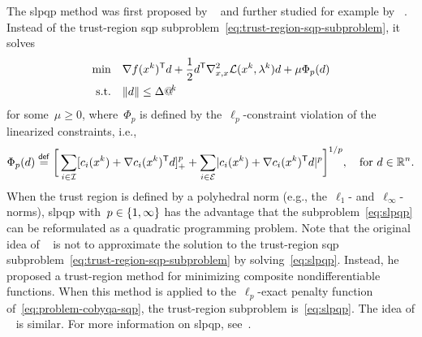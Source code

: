 The \gls{slpqp} method was first proposed by \citeauthor{Fletcher_1982a}~\cite{Fletcher_1982a} and further studied for example by \citeauthor{Yuan_1995}~\cite{Yuan_1995}.
Instead of the trust-region \gls{sqp} subproblem~\cref{eq:trust-region-sqp-subproblem}, it solves
\begin{subequations}
    \label{eq:slpqp}
    \begin{align}
        \min        & \quad \nabla \obj(\iter[k])^{\T} \step + \frac{1}{2} \step^{\T} \nabla_{x, x}^2 \lag(\iter[k], \lm[k]) \step + \mu \Phi_p(d)\\
        \text{s.t.} & \quad \norm{d} \le \rad[k]
    \end{align}
\end{subequations}
for some~$\mu \ge 0$, where~$\Phi_p$ is defined by the~$\ell_p$-constraint violation of the linearized constraints, i.e.,
\begin{equation*}
    \Phi_p(d) \eqdef \bigg[ \sum_{i \in \iub} \posp{\con{i}(\iter[k]) + \nabla \con{i}(\iter[k])^{\T} \step}^p + \sum_{i \in \ieq} \abs{\con{i}(\iter[k]) + \nabla \con{i}(\iter[k])^{\T} \step}^p \bigg]^{1/p}, \quad \text{for~$d \in \R^n$.}
\end{equation*}
When the trust region is defined by a polyhedral norm (e.g., the~$\ell_1$- and~$\ell_{\infty}$-norms), \gls{slpqp} with~$p \in \{1, \infty\}$ has the advantage that the subproblem~\cref{eq:slpqp} can be reformulated as a quadratic programming problem.
Note that the original idea of \citeauthor{Fletcher_1982a}~\cite{Fletcher_1982a} is not to approximate the solution to the trust-region \gls{sqp} subproblem~\cref{eq:trust-region-sqp-subproblem} by solving~\cref{eq:slpqp}.
Instead, he proposed a trust-region method for minimizing composite nondifferentiable functions.
When this method is applied to the~$\ell_p$-exact penalty function of~\cref{eq:problem-cobyqa-sqp}, the trust-region subproblem is~\cref{eq:slpqp}.
The idea of \citeauthor{Yuan_1995}~\cite{Yuan_1995} is similar.
For more information on \gls{slpqp}, see~\cite[\S~8.4.1]{Gould_2021}.

